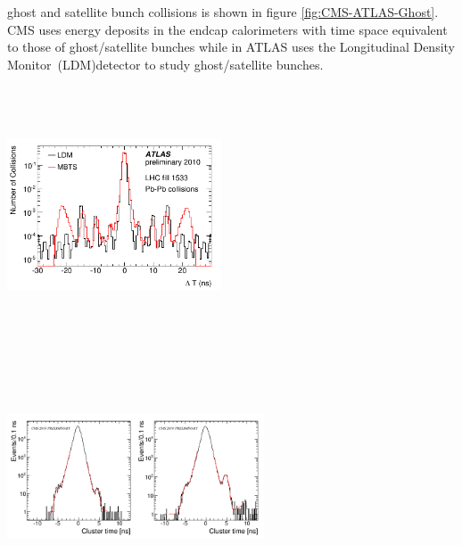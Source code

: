 ghost and satellite bunch collisions is shown in figure \ref{fig:CMS-ATLAS-Ghost}.
 CMS uses energy deposits in the endcap calorimeters with time space equivalent to those of ghost/satellite bunches while in ATLAS
 uses the Longitudinal Density Monitor~(LDM)detector to study ghost/satellite bunches. 
\begin{center}
\centering
\mbox{\includegraphics[height=3.0in,width=2.5in]{THESISPLOTS/ATLAS-LDM-GHOST.png} \quad \quad
\includegraphics[height=3.0in,width=3.0in]{THESISPLOTS/CMS-Ghost-Profile.png}} 
\label{fig:CMS-ATLAS-Ghost}
\end{center}
